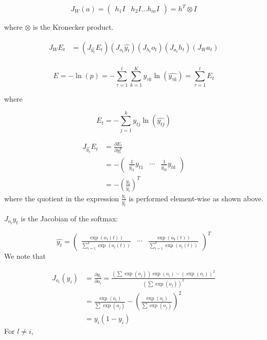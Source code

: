 \begin{equation*}
J_W(a) = \begin{pmatrix}h_1 I & h_2 I \ldots h_m I \end{pmatrix} = h^T \otimes I
\end{equation*}

where $\otimes$ is the Kronecker product.

\begin{align*}
  J_{W}E_t & = (J_{\widehat{y_t}} E_t)(J_{o_t}\widehat{y_t})(J_{h_t}o_t)(J_{a_t}h_t)(J_{W}a_t) \\
\end{align*}

\begin{equation*}
  E = -\ln(p) = -\sum_{\tau=1}^t \sum_{k=1}^K y_{\tau k} \ln\left(\widehat{y_{\tau k}}\right) = \sum_{\tau=1}^{t} E_t
\end{equation*}

where

\begin{equation*}
  E_t = -\sum_{j=1}^{k} y_{tj} \ln \left(\widehat{y_{tj}}\right)
\end{equation*}

\begin{align*}
  J_{\widehat{y_t}}E_t & = \frac{\partial E_t}{\partial y_t^T} \\
  & = -\begin{pmatrix}\frac{1}{\widehat{y_{t1}}}y_{t1} & \cdots & \frac{1}{\widehat{y_{tk}}}y_{tk}\end{pmatrix} \\
  & = -\left(\frac{y_t}{\widehat{y_t}}\right)^T
\end{align*}
%
where the quotient in the expression $\frac{y_t}{\widehat{y_t}}$ is performed element-wise as shown above.

$J_{o_t}\widehat{y_t}$ is the Jacobian of the softmax:

\begin{equation*}
  \widehat{y_t} = \begin{pmatrix}
    \frac{\exp(o_1(t))}{\sum_{i=1}^k \exp(o_i(t))} & \cdots &  \frac{\exp(o_k(t))}{\sum_{i=1}^k \exp(o_i(t))}
  \end{pmatrix}^T
\end{equation*}
%
We note that

\begin{align*}
  J_{o_i}(y_i) & = \frac{\partial y_i}{\partial o_i} = \frac{(\sum \exp(o_j)) \exp(o_i) - (\exp(o_i))^2}{(\sum \exp(o_j))^2} \\
  & = \frac{\exp(o_i)}{\sum \exp(o_j)} - \left(\frac{\exp(o_i)}{\sum \exp(o_j)}\right)^2 \\
  & = y_i (1 - y_i)
\end{align*}
%
For $l \neq i$,

